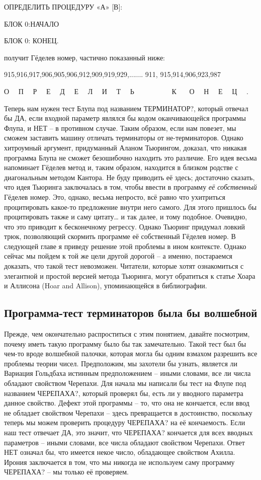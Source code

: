 \documentclass[../main.tex]{subfiles}
\begin{document}
ОПРЕДЕЛИТЬ ПРОЦЕДУРУ «А» {[}В{]}:

БЛОК 0:НАЧАЛО

БЛОК 0: КОНЕЦ.

получит Гёделев номер, частично показанный ниже:

915,916,917,906,905,906,912,909,919,929,....... 911, 915,914,906,923,987

О~~ П~~ Р~~ Е~~ Д~~ Е~~ Л~~ И~~ Т~~ Ь~~~~~~~~~~ К~~~ О~~ Н~~ Е~~ Ц~~ .

Теперь нам нужен тест Блупа под названием ТЕРМИНАТОР?, который отвечал бы ДА, если входной параметр являлся бы кодом оканчивающейся программы Флупа, и НЕТ \--- в противном случае. Таким образом, если нам повезет, мы сможем заставить машину отличать терминаторы от не-терминаторов. Однако хитроумный аргумент, придуманный Аланом Тьюрингом, доказал, что никакая программа Блупа не сможет безошибочно находить это различие. Его идея весьма напоминает Гёделев метод и, таким образом, находится в близком родстве с диагональным методом Кантора. Не буду приводить её здесь; достаточно сказать, что идея Тьюринга заключалась в том, чтобы ввести в программу \emph{её собственный} Гёделев номер. Это, однако, весьма непросто, всё равно что ухитриться процитировать какое-то предложение внутри него самого. Для этого пришлось бы процитировать также и саму цитату\ldots{} и так далее, и тому подобное. Очевидно, что это приводит к бесконечному регрессу. Однако Тьюринг придумал ловкий трюк, позволяющий скормить программе её собственный Гёделев номер. В следующей главе я приведу решение этой проблемы в ином контексте. Однако сейчас мы пойдем к той же цели другой дорогой \--- а именно, постараемся доказать, что такой тест невозможен. Читатели, которые хотят ознакомиться с элегантной и простой версией метода Тьюринга, могут обратиться к статье Хоара и Аллисона (Hoar and Allison), упоминающейся в библиографии.


\subsection{Программа-тест терминаторов была бы волшебной}

Прежде, чем окончательно распроститься с этим понятием, давайте посмотрим, почему иметь такую программу было бы так замечательно. Такой тест был бы чем-то вроде волшебной палочки, которая могла бы одним взмахом разрешить все проблемы теории чисел. Предположим, мы захотели бы узнать, является ли Вариация Гольдбаха истинным предположением \--- иными словами, все ли числа обладают свойством Черепахи. Для начала мы написали бы тест на Флупе под названием ЧЕРЕПАХА?, который проверял бы, есть ли у вводного параметра данное свойство. Дефект этой программы \--- то, что она не кончается, если ввод не обладает свойством Черепахи \--- здесь превращается в достоинство, поскольку теперь мы можем проверить процедуру ЧЕРЕПАХА? на её кончаемость. Если наш тест отвечает ДА, это значит, что ЧЕРЕПАХА? кончается для всех вводных параметров \--- иными словами, все числа обладают свойством Черепахи. Ответ НЕТ означал бы, что имеется некое число, обладающее свойством Ахилла. Ирония заключается в том, что мы никогда не используем саму программу ЧЕРЕПАХА? \--- мы только её проверяем.
\end{document}
